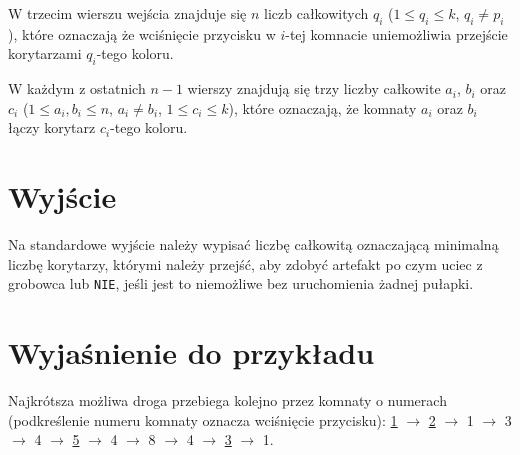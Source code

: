 \documentclass[zad,zawodnik,utf8]{sinol}
\begin{document}
\begin{tasktext}
W trzecim wierszu wejścia znajduje się $n$ liczb całkowitych $q_i$ ($1 \leq q_i \leq k$, $q_i \neq p_i$), które oznaczają że wciśnięcie przycisku w $i$-tej komnacie uniemożliwia przejście korytarzami $q_i$-tego koloru.

W każdym z ostatnich $n-1$ wierszy znajdują się trzy liczby całkowite $a_i$, $b_i$ oraz $c_i$ ($1 \leq a_i, b_i \leq n$, $a_i \neq b_i$, $1 \leq c_i \leq k$), które oznaczają, że komnaty $a_i$ oraz $b_i$ łączy korytarz $c_i$-tego koloru.

  \section{Wyjście}
Na standardowe wyjście należy wypisać liczbę całkowitą oznaczającą minimalną liczbę korytarzy, którymi należy przejść, aby zdobyć artefakt po czym uciec z grobowca lub \texttt{NIE}, jeśli jest to niemożliwe bez uruchomienia żadnej pułapki.

\makecompactexample

  \section{Wyjaśnienie do przykładu}
Najkrótsza możliwa droga przebiega kolejno przez komnaty o numerach (podkreślenie numeru komnaty oznacza wciśnięcie przycisku): \underline{1} $\rightarrow$ \underline{2} $\rightarrow$ 1 $\rightarrow$ 3 $\rightarrow$ 4 $\rightarrow$ \underline{5} $\rightarrow$ 4 $\rightarrow$ 8 $\rightarrow$ 4 $\rightarrow$ \underline{3} $\rightarrow$ 1. 
\end{tasktext}
\end{document}
